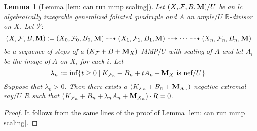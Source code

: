 \documentclass[11pt]{amsart}
\numberwithin{equation}{section}
\newcommand{\Mm}{{\bf{M}}}
\newcommand{\Rr}{\mathbb{R}}
\newcommand{\Ff}{\mathcal{F}}
\newtheorem{lem}[thm]{Lemma}
\theoremstyle{definition}
\theoremstyle{definition}
\theoremstyle{definition}
\begin{document}
\begin{lem}[Lemma \ref{lem: can run mmp scaling}]\label{lem: can run mmp scaling gfq}
        Let $(X,\Ff,B,\Mm)/U$ be an lc algebraically integrable generalized foliated quadruple and $A$ an ample$/U$ $\Rr$-divisor on $X$. Let $\mathcal{P}:$
    $$(X,\Ff,B,\Mm):=(X_0,\Ff_0,B_0,\Mm)\dashrightarrow (X_1,\Ff_1,B_1,\Mm)\dashrightarrow\dots\dashrightarrow (X_n,\Ff_n,B_n,\Mm)$$
    be a sequence of steps of a $(K_{\Ff}+B+\Mm_X)$-MMP$/U$ with scaling of $A$ and let $A_i$ be the image of $A$ on $X_i$ for each $i$. Let
    $$\lambda_n:=\inf\{t\geq 0\mid K_{\Ff_n}+B_n+tA_n+\Mm_X\text{ is nef}/U\}.$$
    Suppose that $\lambda_n>0$. Then there exists a $(K_{\Ff_n}+B_n+\Mm_{X_n})$-negative extremal ray$/U$ $R$ such that $(K_{\Ff_n}+B_n+\lambda_nA_n+\Mm_{X_n})\cdot R=0$.
\end{lem}
\begin{proof}
    It follows from the same lines of the proof of Lemma \ref{lem: can run mmp scaling}.
\end{proof}
\end{document}

